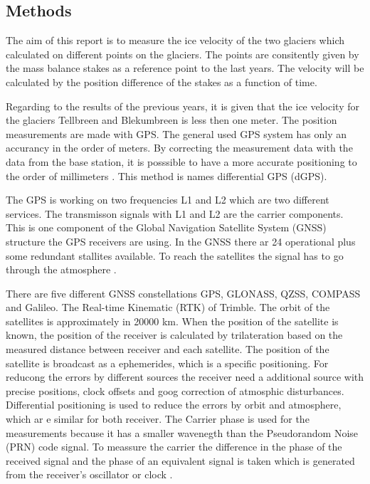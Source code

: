 
\subsection{Methods}

The aim of this report is to measure the ice velocity of the two glaciers which calculated on different points on the glaciers. 
The points are consitently given by the mass balance stakes as a reference point to the last years.
The velocity will be calculated by the position difference of the stakes as a function of time.

Regarding to the results of the previous years, it is given that the ice velocity for the glaciers Tellbreen and Blekumbreen is less then one meter.
The position measurements are made with GPS. 
The general used GPS system has only an accurancy in the order of meters.
By correcting the measurement data with the data from the base station, it is posssible to have a more accurate positioning to the order of millimeters \citep{UGPS}. This method is names differential GPS (dGPS).
\medskip

The GPS is working on two frequencies L1 and L2 which are two different services.
The transmisson signals with L1 and L2 are the carrier components. 
This is one component of the Global Navigation Satellite System (GNSS) structure the GPS receivers are using.
In the GNSS there ar 24 operational plus some redundant stallites available.
To reach the satellites the signal has to go through the atmosphere \citep{curcherdgps}.
\medskip

There are five different GNSS constellations GPS, GLONASS, QZSS, COMPASS and Galileo.
The Real-time Kinematic (RTK) of Trimble.
The orbit of the satellites is approximately in 20000 km.
When the position of the satellite is known, the position of the receiver is calculated by trilateration based on the measured distance between receiver and each satellite.
The position of the satellite is broadcast as a ephemerides, which is a specific positioning.
For reducong the errors by different sources the receiver need a additional source with precise positions, clock offsets and goog correction of atmosphic disturbances. 
Differential positioning is used to reduce the errors by orbit and atmosphere, which ar e similar for both receiver. 
The Carrier phase is used for the measurements because it has a smaller wavenegth than the Pseudorandom Noise (PRN) code signal.
To meassure the carrier the difference in the phase of the received signal and the phase of an equivalent signal is taken which is generated from the receiver’s oscillator or clock \citep{Trprocess}.
\medskip

